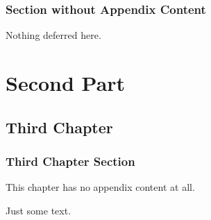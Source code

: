\documentclass{book}
\theoremstyle{plain}
\begin{document}
\section{Section without Appendix Content}

Nothing deferred here.

\part{Second Part}

\chapter{Third Chapter}

\section{Third Chapter Section}

This chapter has no appendix content at all.

Just some text.
\end{document}
